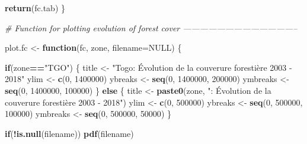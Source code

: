 \documentclass[a4paper, notitlepage, 12pt, krantz2]{krantz}
\newenvironment{Shaded}{\begin{snugshade}}{\end{snugshade}}
\newcommand{\CommentTok}[1]{\textcolor[rgb]{0.56,0.35,0.01}{\textit{#1}}}
\newcommand{\ControlFlowTok}[1]{\textcolor[rgb]{0.13,0.29,0.53}{\textbf{#1}}}
\newcommand{\DataTypeTok}[1]{\textcolor[rgb]{0.13,0.29,0.53}{#1}}
\newcommand{\DecValTok}[1]{\textcolor[rgb]{0.00,0.00,0.81}{#1}}
\newcommand{\KeywordTok}[1]{\textcolor[rgb]{0.13,0.29,0.53}{\textbf{#1}}}
\newcommand{\NormalTok}[1]{#1}
\newcommand{\OperatorTok}[1]{\textcolor[rgb]{0.81,0.36,0.00}{\textbf{#1}}}
\newcommand{\OtherTok}[1]{\textcolor[rgb]{0.56,0.35,0.01}{#1}}
\newcommand{\StringTok}[1]{\textcolor[rgb]{0.31,0.60,0.02}{#1}}
\begin{document}
\begin{Shaded}
\begin{Highlighting}[]
  \KeywordTok{return}\NormalTok{(fc.tab)}
\NormalTok{\}}
  
\CommentTok{# Function for plotting evolution of forest cover -----------------------------------------}

\NormalTok{plot.fc <-}\StringTok{ }\ControlFlowTok{function}\NormalTok{(fc, zone, }\DataTypeTok{filename=}\OtherTok{NULL}\NormalTok{) \{}
  
  \ControlFlowTok{if}\NormalTok{(zone}\OperatorTok{==}\StringTok{"TGO"}\NormalTok{) \{}
\NormalTok{    title    <-}\StringTok{ "Togo: Évolution de la couverure forestière 2003 - 2018"}
\NormalTok{    ylim     <-}\StringTok{ }\KeywordTok{c}\NormalTok{(}\DecValTok{0}\NormalTok{, }\DecValTok{1400000}\NormalTok{)}
\NormalTok{    ybreaks  <-}\StringTok{ }\KeywordTok{seq}\NormalTok{(}\DecValTok{0}\NormalTok{, }\DecValTok{1400000}\NormalTok{, }\DecValTok{200000}\NormalTok{)}
\NormalTok{    ymbreaks <-}\StringTok{ }\KeywordTok{seq}\NormalTok{(}\DecValTok{0}\NormalTok{, }\DecValTok{1400000}\NormalTok{, }\DecValTok{100000}\NormalTok{)}
\NormalTok{  \} }\ControlFlowTok{else}\NormalTok{ \{}
\NormalTok{    title    <-}\StringTok{ }\KeywordTok{paste0}\NormalTok{(zone, }\StringTok{": Évolution de la couverure forestière 2003 - 2018"}\NormalTok{)}
\NormalTok{    ylim     <-}\StringTok{ }\KeywordTok{c}\NormalTok{(}\DecValTok{0}\NormalTok{, }\DecValTok{500000}\NormalTok{)}
\NormalTok{    ybreaks  <-}\StringTok{ }\KeywordTok{seq}\NormalTok{(}\DecValTok{0}\NormalTok{, }\DecValTok{500000}\NormalTok{, }\DecValTok{100000}\NormalTok{)}
\NormalTok{    ymbreaks <-}\StringTok{ }\KeywordTok{seq}\NormalTok{(}\DecValTok{0}\NormalTok{, }\DecValTok{500000}\NormalTok{, }\DecValTok{50000}\NormalTok{)}
\NormalTok{  \} }
  
  \ControlFlowTok{if}\NormalTok{(}\OperatorTok{!}\KeywordTok{is.null}\NormalTok{(filename)) }\KeywordTok{pdf}\NormalTok{(filename)}
  

\end{Highlighting}
\end{Shaded}
\end{document}
